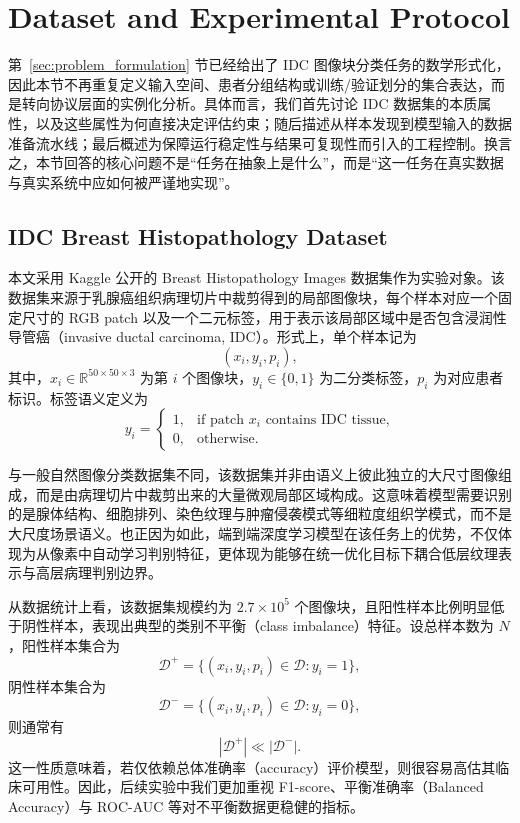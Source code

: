 ﻿\section{Dataset and Experimental Protocol}
\label{sec:dataset_protocol}

第~\ref{sec:problem_formulation} 节已经给出了 IDC 图像块分类任务的数学形式化，因此本节不再重复定义输入空间、患者分组结构或训练/验证划分的集合表达，而是转向协议层面的实例化分析。具体而言，我们首先讨论 IDC 数据集的本质属性，以及这些属性为何直接决定评估约束；随后描述从样本发现到模型输入的数据准备流水线；最后概述为保障运行稳定性与结果可复现性而引入的工程控制。换言之，本节回答的核心问题不是“任务在抽象上是什么”，而是“这一任务在真实数据与真实系统中应如何被严谨地实现”。

\subsection{IDC Breast Histopathology Dataset}

本文采用 Kaggle 公开的 Breast Histopathology Images 数据集作为实验对象。该数据集来源于乳腺癌组织病理切片中裁剪得到的局部图像块，每个样本对应一个固定尺寸的 RGB patch 以及一个二元标签，用于表示该局部区域中是否包含浸润性导管癌（invasive ductal carcinoma, IDC）。形式上，单个样本记为
\begin{equation}
    (x_i, y_i, p_i),
\end{equation}
其中，$x_i \in \mathbb{R}^{50 \times 50 \times 3}$ 为第 $i$ 个图像块，$y_i \in \{0,1\}$ 为二分类标签，$p_i$ 为对应患者标识。标签语义定义为
\begin{equation}
    y_i =
    \begin{cases}
        1, & \text{if patch } x_i \text{ contains IDC tissue,} \\
        0, & \text{otherwise.}
    \end{cases}
\end{equation}

与一般自然图像分类数据集不同，该数据集并非由语义上彼此独立的大尺寸图像组成，而是由病理切片中裁剪出来的大量微观局部区域构成。这意味着模型需要识别的是腺体结构、细胞排列、染色纹理与肿瘤侵袭模式等细粒度组织学模式，而不是大尺度场景语义。也正因为如此，端到端深度学习模型在该任务上的优势，不仅体现为从像素中自动学习判别特征，更体现为能够在统一优化目标下耦合低层纹理表示与高层病理判别边界。

从数据统计上看，该数据集规模约为 $2.7 \times 10^5$ 个图像块，且阳性样本比例明显低于阴性样本，表现出典型的类别不平衡（class imbalance）特征。设总样本数为 $N$，阳性样本集合为
\begin{equation}
    \mathcal{D}^{+} = \{(x_i,y_i,p_i) \in \mathcal{D} : y_i = 1\},
\end{equation}
阴性样本集合为
\begin{equation}
    \mathcal{D}^{-} = \{(x_i,y_i,p_i) \in \mathcal{D} : y_i = 0\},
\end{equation}
则通常有
\begin{equation}
    |\mathcal{D}^{+}| \ll |\mathcal{D}^{-}|.
\end{equation}
这一性质意味着，若仅依赖总体准确率（accuracy）评价模型，则很容易高估其临床可用性。因此，后续实验中我们更加重视 F1-score、平衡准确率（Balanced Accuracy）与 ROC-AUC 等对不平衡数据更稳健的指标。

